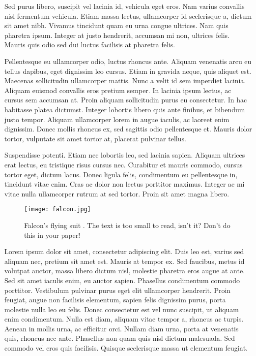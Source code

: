 \documentclass[twocolumn]{IEEEtran}
\begin{document}
Sed purus libero, suscipit vel lacinia id, vehicula eget eros. Nam varius convallis nisl fermentum vehicula. Etiam massa lectus, ullamcorper id scelerisque a, dictum sit amet nibh. Vivamus tincidunt quam eu urna congue ultrices. Nam quis pharetra ipsum. Integer at justo hendrerit, accumsan mi non, ultrices felis. Mauris quis odio sed dui luctus facilisis at pharetra felis.

Pellentesque eu ullamcorper odio, luctus rhoncus ante. Aliquam venenatis arcu eu tellus dapibus, eget dignissim leo cursus. Etiam in gravida neque, quis aliquet est. Maecenas sollicitudin ullamcorper mattis. Nunc a velit id sem imperdiet lacinia. Aliquam euismod convallis eros pretium semper. In lacinia ipsum lectus, ac cursus sem accumsan at. Proin aliquam sollicitudin purus eu consectetur. In hac habitasse platea dictumst. Integer lobortis libero quis ante finibus, et bibendum justo tempor. Aliquam ullamcorper lorem in augue iaculis, ac laoreet enim dignissim. Donec mollis rhoncus ex, sed sagittis odio pellentesque et. Mauris dolor tortor, vulputate sit amet tortor at, placerat pulvinar tellus.

Suspendisse potenti. Etiam nec lobortis leo, sed lacinia sapien. Aliquam ultrices erat lectus, eu tristique risus cursus nec. Curabitur et mauris commodo, cursus tortor eget, dictum lacus. Donec ligula felis, condimentum eu pellentesque in, tincidunt vitae enim. Cras ac dolor non lectus porttitor maximus. Integer ac mi vitae nulla ullamcorper rutrum at sed tortor. Proin sit amet magna libero.

\begin{figure}[h]
\begin{center}
\texttt{[image: falcon.jpg]}
\end{center}
\caption{Falcon's flying suit \cite{marvel}. The text is too small to read, isn't it? Don't do this in your paper!}
\end{figure}

Lorem ipsum dolor sit amet, consectetur adipiscing elit. Duis leo est, varius sed aliquam nec, pretium sit amet est. Mauris at tempor ex. Sed faucibus, metus id volutpat auctor, massa libero dictum nisl, molestie pharetra eros augue at ante. Sed sit amet iaculis enim, eu auctor sapien. Phasellus condimentum commodo porttitor. Vestibulum pulvinar purus eget elit ullamcorper hendrerit. Proin feugiat, augue non facilisis elementum, sapien felis dignissim purus, porta molestie nulla leo eu felis. Donec consectetur est vel nunc suscipit, ut aliquam enim condimentum. Nulla est diam, aliquam vitae tempor a, rhoncus ac turpis. Aenean in mollis urna, ac efficitur orci. Nullam diam urna, porta at venenatis quis, rhoncus nec ante. Phasellus non quam quis nisl dictum malesuada. Sed commodo vel eros quis facilisis. Quisque scelerisque massa ut elementum feugiat.
\end{document}
